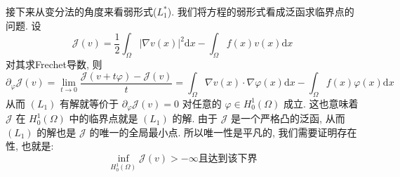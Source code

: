 \documentclass[11pt]{ctexart}[UTF8]
\begin{document}
接下来从变分法的角度来看弱形式($L_{1}^*$). 我们将方程的弱形式看成泛函求临界点的问题. 设
\begin{equation*}
    \mathcal{J}(v) = \frac{1}{2}\int_{\Omega} |\nabla v(x)|^2 \mathrm{d}x - \int_{\Omega} f(x) v(x) \mathrm{d}x
\end{equation*}
对其求Frechet导数, 则 
\begin{equation*}
    \partial_{\varphi} \mathcal{J}(v) = \lim\limits_{t \to 0} \frac{\mathcal{J}(v+t\varphi) - \mathcal{J}(v)}{t} = \int_{\Omega} \nabla v(x) \cdot \nabla \varphi(x) \mathrm{d}x - \int_{\Omega} f(x) \varphi(x) \mathrm{d}x 
\end{equation*}
从而 $(L_{1})$ 有解就等价于 $\partial_{\varphi} \mathcal{J}(v) = 0$ 对任意的 $\varphi \in H_{0}^{1}(\Omega)$ 成立. 这也意味着 $\mathcal{J}$ 在 $H_{0}^{1}(\Omega)$ 中的临界点就是 $(L_{1})$ 的解. 
由于 $\mathcal{J}$ 是一个严格凸的泛函, 从而 $(L_{1})$ 的解也是 $\mathcal{J}$ 的唯一的全局最小点. 所以唯一性是平凡的, 我们需要证明存在性, 也就是:
\begin{equation*}
    \inf\limits_{H_{0}^{1}(\Omega)} \mathcal{J}(v)>-\infty \text{且达到该下界}
\end{equation*}
\end{document}
